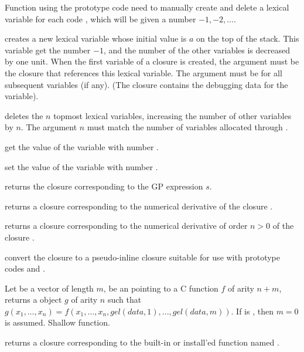 \label{se:pushlex}

Function using the prototype code  need to manually create and delete a
lexical variable for each code , which will be given a number $-1, -2,
\ldots$.

 creates a new lexical variable whose
initial value is $a$ on the top of the stack. This variable get the number
$-1$, and the number of the other variables is decreased by one unit. When
the first variable of a closure is created, the argument  must be the
closure that references this lexical variable. The argument  must be
 for all subsequent variables (if any).  (The closure contains the
debugging data for the variable).

 deletes the $n$ topmost lexical variables,
increasing the number of other variables by $n$. The argument $n$ must match
the number of variables allocated through .

 get the value of the variable with number .

 set the value of the variable with number
.


 returns the closure corresponding to the
GP expression $s$.

 returns a closure corresponding to the
numerical derivative of the closure .

 returns a closure corresponding to
the numerical derivative of order $n > 0$ of the closure .

 convert the closure  to
a pseudo-inline closure suitable for use with prototype codes  and
.

Let  be a vector of length $m$,  be an 
pointing to a C function $f$ of arity $n+m$, returns a  object
$g$ of arity $n$ such that
$g(x_1,\ldots,x_n)=f(x_1,\ldots,x_n,gel(data,1),...,gel(data,m))$. If
 is , then $m=0$ is assumed. Shallow function.

 returns a closure corresponding to the
built-in or install'ed function named .

